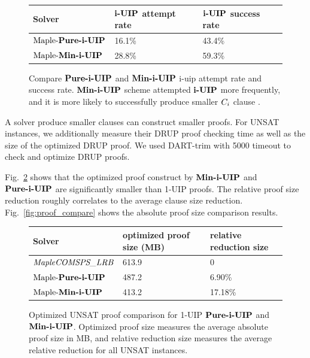 \begin{figure} 
\begin{center} 
\begin{tabular}{ | m{3.5cm} | m{5cm}| m{5cm} | } 
\hline
Solver & $\textbf{i-UIP}$ attempt rate & $\textbf{i-UIP}$ success rate  \\ 
\hline
$\text{Maple-\textbf{Pure-i-UIP}}$ & 16.1\% & 43.4\% \\ 
\hline
$\text{Maple-\textbf{Min-i-UIP}}$ & 28.8\% & 59.3\% \\ 
\hline
\end{tabular}
\end{center}
\caption{Compare $\textbf{Pure-i-UIP}$ and $\textbf{Min-i-UIP}$ i-uip attempt rate and success rate. $\textbf{Min-i-UIP}$ scheme attempted $\textbf{i-UIP}$ more frequently, and it is more likely to successfully produce smaller $C_{i}$ clause .}
\label{fig:t2}
\end{figure}

A solver produce smaller clauses can construct smaller proofs. For UNSAT instances, we additionally measure their DRUP\cite{} proof checking time as well as the size of the optimized DRUP proof. We used DART-trim \cite{} with 5000 timeout to check and optimize DRUP proofs. 

Fig.~\ref{fig:t3} shows that the optimized proof construct by $\textbf{Min-i-UIP}$ and $\textbf{Pure-i-UIP}$ are significantly smaller than 1-UIP proofs. The relative proof size reduction roughly correlates to the average clause size reduction. Fig.~\ref{fig:proof_compare} shows the absolute proof size comparison results. 

\begin{figure} 
\begin{center} 
\begin{tabular}{ | m{3.5cm} | m{5cm}| m{5cm} | } 
\hline
Solver & optimized proof size (MB) & relative reduction size  \\ 
\hline
$\textit{MapleCOMSPS\_LRB}$ & 613.9 & 0  \\ 
\hline
$\text{Maple-\textbf{Pure-i-UIP}}$ & 487.2 & 6.90\% \\ 
\hline
$\text{Maple-\textbf{Min-i-UIP}}$ & 413.2 & 17.18\% \\ 
\hline
\end{tabular}
\end{center}
\caption{Optimized UNSAT proof comparison for 1-UIP $\textbf{Pure-i-UIP}$ and $\textbf{Min-i-UIP}$. Optimized proof size measures the average absolute proof size in MB, and relative reduction size measures the average relative reduction for all UNSAT instances.}
\label{fig:t3}
\end{figure}

